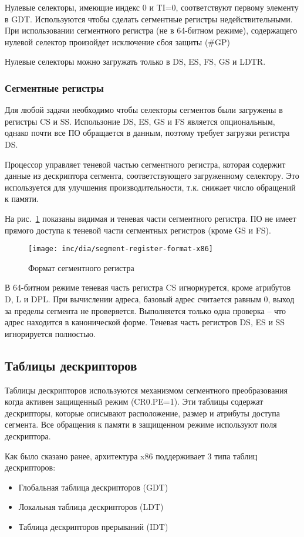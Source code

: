 Нулевые селекторы, имеющие индекс 0 и TI=0, соответствуют первому элементу в GDT. Используются
чтобы сделать сегментные регистры недействительными. При использовании сегментного регистра (не в 64-битном режиме),
содержащего нулевой селектор произойдет исключение сбоя защиты (\#GP)

Нулевые селекторы можно загружать только в DS, ES, FS, GS и LDTR.

\subsubsection*{Сегментные регистры}
Для любой задачи необходимо чтобы селекторы сегментов были загружены в регистры CS и SS.
Использоние DS, ES, GS и FS является опциональным, однако почти все ПО обращается в данным,
поэтому требует загрузки регистра DS.

Процессор управляет теневой частью сегментного регистра, которая содержит данные из дескриптора
сегмента, соответствующего загруженному селектору. Это используется для улучшения производительности,
т.к. снижает число обращений к памяти.

На рис.~\ref{fig:segment-register-format-x86} показаны видимая и теневая части сегментного регистра.
ПО не имеет прямого доступа к теневой части сегментных регистров (кроме GS и FS).

\begin{figure}
  \centering
  \texttt{[image: inc/dia/segment-register-format-x86]}
  \caption{Формат сегментного регистра}
  \label{fig:segment-register-format-x86}
\end{figure}

В 64-битном режиме теневая часть регистра CS игнориурется, кроме атрибутов D, L и DPL.
При вычислении адреса, базовый адрес считается равным 0, выход за пределы сегмента не проверяется.
Выполняется только одна проверка -- что адрес находится в канонической форме. Теневая часть
регистров DS, ES и SS игнорируется полностью.

\subsection{Таблицы дескрипторов}
Таблицы дескрипторов используются механизмом сегментного преобразования когда активен
защищенный режим (CR0.PE=1). Эти таблицы содержат дескрипторы, которые описывают расположение,
размер и атрибуты доступа сегмента. Все обращения к памяти в защищенном режиме используют
поля дескриптора.

Как было сказано ранее, архитектура x86 поддерживает 3 типа таблиц дескрипторов:
\begin{itemize}
	\item Глобальная таблица дескрипторов (GDT)
	\item Локальная таблица дескрипторов (LDT)
	\item Таблица дескрипторов прерываний (IDT)
\end{itemize}

